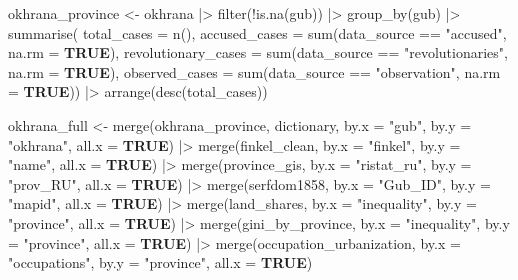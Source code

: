 \documentclass[
  9pt,
  letterpaper,
  DIV=11,
  numbers=noendperiod]{scrartcl}
\newenvironment{Shaded}{\begin{snugshade}}{\end{snugshade}}
\newcommand{\AttributeTok}[1]{\textcolor[rgb]{0.16,0.50,0.73}{#1}}
\newcommand{\ConstantTok}[1]{\textcolor[rgb]{0.15,0.68,0.68}{\textbf{#1}}}
\newcommand{\FunctionTok}[1]{\textcolor[rgb]{0.56,0.27,0.68}{#1}}
\newcommand{\NormalTok}[1]{\textcolor[rgb]{0.81,0.81,0.76}{#1}}
\newcommand{\OtherTok}[1]{\textcolor[rgb]{0.15,0.68,0.38}{#1}}
\newcommand{\SpecialCharTok}[1]{\textcolor[rgb]{0.24,0.68,0.91}{#1}}
\newcommand{\StringTok}[1]{\textcolor[rgb]{0.96,0.31,0.31}{#1}}
\begin{document}
\begin{Shaded}
\begin{Highlighting}[]
\NormalTok{okhrana\_province }\OtherTok{\textless{}{-}}\NormalTok{ okhrana }\SpecialCharTok{|\textgreater{}}
  \FunctionTok{filter}\NormalTok{(}\SpecialCharTok{!}\FunctionTok{is.na}\NormalTok{(gub)) }\SpecialCharTok{|\textgreater{}}
  \FunctionTok{group\_by}\NormalTok{(gub) }\SpecialCharTok{|\textgreater{}}
  \FunctionTok{summarise}\NormalTok{(}
    \AttributeTok{total\_cases =} \FunctionTok{n}\NormalTok{(),}
    \AttributeTok{accused\_cases =} \FunctionTok{sum}\NormalTok{(data\_source }\SpecialCharTok{==} \StringTok{"accused"}\NormalTok{, }\AttributeTok{na.rm =} \ConstantTok{TRUE}\NormalTok{),}
    \AttributeTok{revolutionary\_cases =} \FunctionTok{sum}\NormalTok{(data\_source }\SpecialCharTok{==} \StringTok{"revolutionaries"}\NormalTok{, }\AttributeTok{na.rm =} \ConstantTok{TRUE}\NormalTok{),}
    \AttributeTok{observed\_cases =} \FunctionTok{sum}\NormalTok{(data\_source }\SpecialCharTok{==} \StringTok{"observation"}\NormalTok{, }\AttributeTok{na.rm =} \ConstantTok{TRUE}\NormalTok{)) }\SpecialCharTok{|\textgreater{}}
  \FunctionTok{arrange}\NormalTok{(}\FunctionTok{desc}\NormalTok{(total\_cases))}

\NormalTok{okhrana\_full }\OtherTok{\textless{}{-}} \FunctionTok{merge}\NormalTok{(okhrana\_province, dictionary, }
                      \AttributeTok{by.x =} \StringTok{"gub"}\NormalTok{, }\AttributeTok{by.y =} \StringTok{"okhrana"}\NormalTok{, }\AttributeTok{all.x =} \ConstantTok{TRUE}\NormalTok{) }\SpecialCharTok{|\textgreater{}} 
  \FunctionTok{merge}\NormalTok{(finkel\_clean, }\AttributeTok{by.x =} \StringTok{"finkel"}\NormalTok{, }\AttributeTok{by.y =} \StringTok{"name"}\NormalTok{, }\AttributeTok{all.x =} \ConstantTok{TRUE}\NormalTok{) }\SpecialCharTok{|\textgreater{}} 
  \FunctionTok{merge}\NormalTok{(province\_gis, }\AttributeTok{by.x =} \StringTok{"ristat\_ru"}\NormalTok{, }\AttributeTok{by.y =} \StringTok{"prov\_RU"}\NormalTok{, }\AttributeTok{all.x =} \ConstantTok{TRUE}\NormalTok{) }\SpecialCharTok{|\textgreater{}}
  \FunctionTok{merge}\NormalTok{(serfdom1858, }\AttributeTok{by.x =} \StringTok{"Gub\_ID"}\NormalTok{, }\AttributeTok{by.y =} \StringTok{"mapid"}\NormalTok{, }\AttributeTok{all.x =} \ConstantTok{TRUE}\NormalTok{) }\SpecialCharTok{|\textgreater{}} 
  \FunctionTok{merge}\NormalTok{(land\_shares, }\AttributeTok{by.x =} \StringTok{"inequality"}\NormalTok{, }\AttributeTok{by.y =} \StringTok{"province"}\NormalTok{, }\AttributeTok{all.x =} \ConstantTok{TRUE}\NormalTok{) }\SpecialCharTok{|\textgreater{}} 
  \FunctionTok{merge}\NormalTok{(gini\_by\_province, }\AttributeTok{by.x =} \StringTok{"inequality"}\NormalTok{, }\AttributeTok{by.y =} \StringTok{"province"}\NormalTok{, }\AttributeTok{all.x =} \ConstantTok{TRUE}\NormalTok{) }\SpecialCharTok{|\textgreater{}} 
  \FunctionTok{merge}\NormalTok{(occupation\_urbanization, }\AttributeTok{by.x =} \StringTok{"occupations"}\NormalTok{, }\AttributeTok{by.y =} \StringTok{"province"}\NormalTok{, }
        \AttributeTok{all.x =} \ConstantTok{TRUE}\NormalTok{)}
\end{Highlighting}
\end{Shaded}
\end{document}
